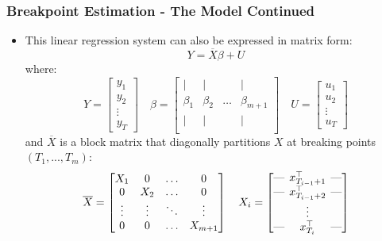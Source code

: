 \documentclass[9pt]{beamer}
\begin{document}
\begin{frame}
  \frametitle{Breakpoint Estimation - The Model Continued}
  \begin{itemize}
    \item 
This linear regression system can also be expressed in matrix form:
\[
Y = \overline{X}\beta + U
\]
where:
\[
Y =
\begin{bmatrix}
y_1 \\
y_2 \\
\vdots \\
y_T
\end{bmatrix}
\quad
\beta =
\begin{bmatrix}
\vert & \vert &  & \vert \\
\beta_{1} & \beta_{2}  & \hdots & \beta_{m+1}\\
\vert & \vert &  & \vert\\
\end{bmatrix}
\quad
U =
\begin{bmatrix}
u_1 \\
u_2 \\
\vdots \\
u_T
\end{bmatrix}
\]
and $\overline{X}$ is a block matrix that
diagonally partitions $X$ at breaking points $(T_1,..., T_m)$:
\[
\overline{X} =
\begin{bmatrix}
X_1 & 0 & \hdots & 0\\
 0 & X_2 & \hdots & 0 \\
\vdots & \vdots & \ddots & \vdots \\
 0 & 0 & \hdots & X_{m+1} 
\end{bmatrix}
\quad
X_i = 
\begin{bmatrix}
  \text{---} \hspace{-0.2cm} & x_{T_{i-1} + 1}^{\top} & \hspace{-0.2cm}\text{---} \\
  \text{---} \hspace{-0.2cm} & x_{T_{i-1} + 2}^{\top} & \hspace{-0.2cm}\text{---} \\
  & \vdots & \\ 
 \text{---} \hspace{-0.2cm} & x_{T_i}^{\top} & \hspace{-0.2cm}\text{---}  \\
\end{bmatrix}
\]
\end{itemize}  
\end{frame}
\end{document}

